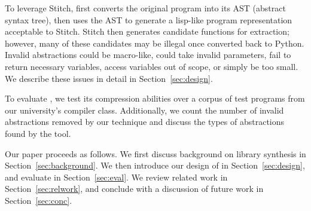 To leverage Stitch, \toolname first converts the original \ptwo{} program into its AST (abstract syntax tree), then
uses the AST to generate a lisp-like program representation
acceptable to Stitch.  Stitch then generates candidate
functions for extraction; however, many of these candidates
may be illegal once converted back to Python.  Invalid abstractions could be macro-like, could take invalid parameters, fail to return necessary variables, access variables out of scope, or simply be too small. We describe these issues in detail in Section~\ref{sec:design}. 


To evaluate \toolname, we test its compression abilities over a corpus of  test programs from our university's compiler class. Additionally, we count the number of invalid abstractions removed by our technique and discuss the types of abstractions found by the tool.

Our paper proceeds as follows.  We first discuss background on library synthesis in Section~\ref{sec:background}.  We then introduce our design of \toolname{} in Section~\ref{sec:design}, and evaluate in Section~\ref{sec:eval}.  We review related work in Section~\ref{sec:relwork}, and conclude with a discussion
of future work in Section~\ref{sec:conc}.



